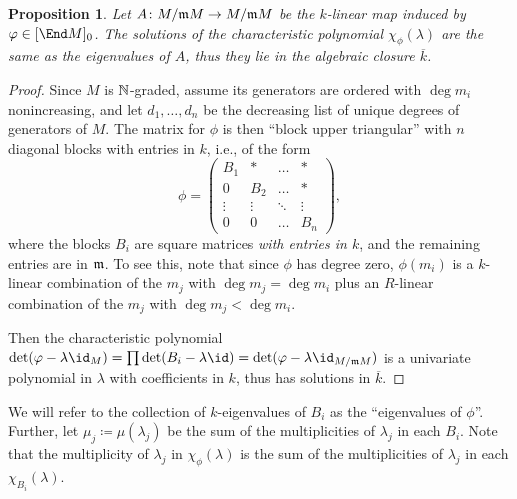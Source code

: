 \documentclass[12pt]{article}
\let\bar\overline
\theoremstyle{theorem}
\numberwithin{thm}{section}
\newtheorem{prop}[thm]{Proposition}
\theoremstyle{definition}
\begin{document}
\begin{prop}\label{prop:eigenvalues}
  Let $A\colon M/\mathfrak m M\to M/\mathfrak m M$ be the $k$-linear map induced by $\phi\in[\End M]_0$. The solutions of the characteristic polynomial $\chi_\phi(\lambda)$ are the same as the eigenvalues of $A$, thus they lie in the algebraic closure $\bar k$.
\end{prop}
\begin{proof}
  Since $M$ is $\mathbb N$-graded, assume its generators are ordered with $\deg m_i$ nonincreasing, and let $d_1,\dots,d_n$ be the decreasing list of unique degrees of generators of $M$. The matrix for $\phi$ is then ``block upper triangular'' with $n$ diagonal blocks with entries in $k$, i.e., of the form
  \begin{equation}\label{eq:blocks}
    \phi = \begin{pmatrix}
    B_1    & *      & \dots  & *      \\
    0      & B_2    & \dots  & *      \\
    \vdots & \vdots & \ddots & \vdots \\
    0      & 0      & \dots  & B_n
    \end{pmatrix},
  \end{equation}
  where the blocks $B_i$ are square matrices \emph{with entries in $k$}, and the remaining entries are in $\mathfrak m$. To see this, note that since $\phi$ has degree zero, $\phi(m_i)$ is a $k$-linear combination of the $m_j$ with $\deg m_j = \deg m_i$ plus an $R$-linear combination of the $m_j$ with $\deg m_j < \deg m_i$. %

  Then the characteristic polynomial $\det(\phi - \lambda \id_M) = \prod \det(B_i - \lambda \id) = \det(\phi - \lambda \id_{M/\m M})$ is a univariate polynomial in $\lambda$ with coefficients in $k$, thus has solutions in $\bar k$.
\end{proof}

We will refer to the collection of $k$-eigenvalues of $B_i$ as the ``eigenvalues of $\phi$''. Further, let $\mu_j \coloneqq \mu(\lambda_j)$ be the sum of the multiplicities of $\lambda_j$ in each $B_i$. Note that the multiplicity of $\lambda_j$ in $\chi_\phi(\lambda)$ is the sum of the multiplicities of $\lambda_j$ in each $\chi_{B_i}(\lambda)$.
\end{document}
